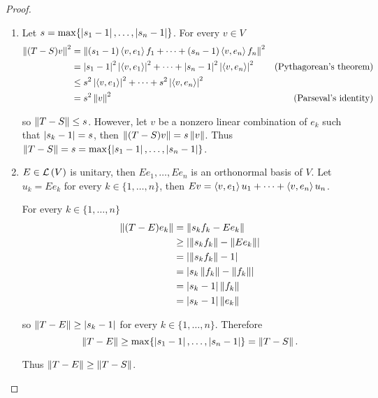 \begin{proof}
    \begin{enumerate}[label={(\alph*)}]
        \item Let $s = \max\{ \left\vert{s_{1} - 1}\right\vert, \ldots, \left\vert{s_{n} - 1}\right\vert \}$.
              For every $v\in V$
              \begin{align*}
                  \left\Vert{(T - S)v}\right\Vert^{2} & = \left\Vert{(s_{1} - 1)\left\langle{v,e_{1}}\right\rangle f_{1} + \cdots + (s_{n} - 1)\left\langle{v,e_{n}}\right\rangle f_{n}}\right\Vert^{2}                                                     \\
                                      & = {\left\vert{s_{1} - 1}\right\vert}^{2}\left\vert{\left\langle{v,e_{1}}\right\rangle}\right\vert^{2} + \cdots + {\left\vert{s_{n} - 1}\right\vert}^{2}\left\vert{\left\langle{v,e_{n}}\right\rangle}\right\vert^{2} & \text{(Pythagorean's theorem)} \\
                                      & \leq s^{2}\left\vert{\left\langle{v,e_{1}}\right\rangle}\right\vert^{2} + \cdots + s^{2}\left\vert{\left\langle{v,e_{n}}\right\rangle}\right\vert^{2}                                                               \\
                                      & = s^{2}\left\Vert{v}\right\Vert^{2}                                                                                                & \text{(Parseval's identity)}
              \end{align*}

              so $\left\Vert{T - S}\right\Vert\leq s$. However, let $v$ be a nonzero linear combination of $e_{k}$ such that $\left\vert{s_{k} - 1}\right\vert = s$, then $\left\Vert{(T - S)v}\right\Vert = s\left\Vert{v}\right\Vert$. Thus $\left\Vert{T - S}\right\Vert = s = \max\{ \left\vert{s_{1} - 1}\right\vert, \ldots, \left\vert{s_{n} - 1}\right\vert \}$.
        \item $E\in\mathcal{L}\left({V}\right)$ is unitary, then $Ee_{1}, \ldots, Ee_{n}$ is an orthonormal basis of $V$. Let $u_{k} = Ee_{k}$ for every $k\in\{1,\ldots,n\}$, then $Ev = \left\langle{v,e_{1}}\right\rangle u_{1} + \cdots + \left\langle{v,e_{n}}\right\rangle u_{n}$.

              For every $k\in\{1,\ldots,n\}$
              \begin{align*}
                  \left\Vert{(T - E)e_{k}}\right\Vert & = \left\Vert{s_{k}f_{k} - Ee_{k}}\right\Vert                 \\
                                      & \geq \left\vert{\left\Vert{s_{k}f_{k}}\right\Vert - \left\Vert{Ee_{k}}\right\Vert}\right\vert \\
                                      & = \left\vert{\left\Vert{s_{k}f_{k}}\right\Vert - 1}\right\vert                \\
                                      & = \left\vert{s_{k}\left\Vert{f_{k}}\right\Vert - \left\Vert{f_{k}}\right\Vert}\right\vert     \\
                                      & = \left\vert{s_{k} - 1}\right\vert\left\Vert{f_{k}}\right\Vert                \\
                                      & = \left\vert{s_{k} - 1}\right\vert\left\Vert{e_{k}}\right\Vert
              \end{align*}

              so $\left\Vert{T - E}\right\Vert\geq \left\vert{s_{k} - 1}\right\vert$ for every $k\in\{1,\ldots,n\}$. Therefore
              \[
                  \left\Vert{T - E}\right\Vert\geq \max\{ \left\vert{s_{1} - 1}\right\vert, \ldots, \left\vert{s_{n} - 1}\right\vert \} = \left\Vert{T - S}\right\Vert.
              \]

              Thus $\left\Vert{T - E}\right\Vert\geq \left\Vert{T - S}\right\Vert$.
    \end{enumerate}
\end{proof}
\newpage

